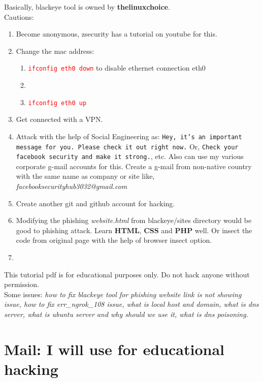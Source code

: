 \documentclass[12 pt, letterpaper]{extarticle}
\newcommand{\R}{\textcolor{red}} %
\newcommand{\T}{\texttt}
\begin{document}
\vspace{5mm}

Basically, blackeye tool is owned by \textbf{thelinuxchoice}. \\
Cautions:
\begin{enumerate}
	\item Become anonymous, zsecurity has a tutorial on youtube for this.
	\item Change the mac address:
	      \begin{enumerate}
		      \item \R{\T{ifconfig eth0 down}} to disable ethernet connection eth0
		      \item \R{\T{}}
		      \item \R{\T{ifconfig eth0 up}}
	      \end{enumerate}
	\item Get connected with a VPN.
	\item Attack with the help of Social Engineering as: \texttt{Hey, it's an important message for you. Please check it out right now.} Or, \texttt{Check your facebook security and make it strong.}, etc. Also can use my various corporate g-mail accounts for this. Create a g-mail from non-native country with the same name as company or site like, \textit{facebooksecurityhub3032@gmail.com}
	\item Create another git and github account for hacking.
	\item Modifying the phishing \textit{website.html} from blackeye/sites directory would be good to phishing attack. Learn \textbf{HTML}, \textbf{CSS} and \textbf{PHP} well. Or insect the code from original page with the help of browser insect option.
	\item
\end{enumerate}

This tutorial pdf is for educational purposes only. Do not hack anyone without permission. \\

Some issues: \textit{how to fix blackeye tool for phishing website link is not showing issue, how to fix err\_ngrok\_108 issue, what is local host and domain, what is dns server, what is ubuntu server and why should we use it, what is dns poisoning.}

\section*{Mail: I will use for educational hacking}
\end{document}
